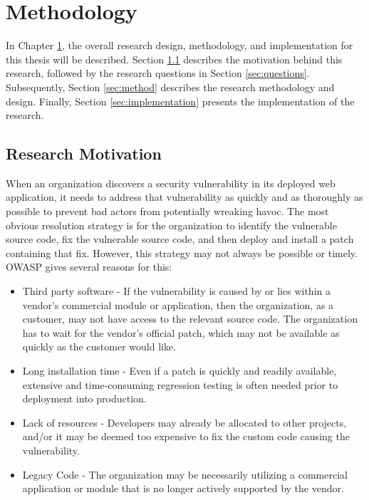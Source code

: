 \chapter{Methodology} \label{chap:method}
In Chapter \ref{chap:method}, the overall research design, methodology, and implementation for this thesis will be described. Section \ref{sec:motivation} describes the motivation behind this research, followed by the research questions in Section \ref{sec:questions}. Subsequently, Section \ref{sec:method} describes the research methodology and design. Finally, Section \ref{sec:implementation} presents the implementation of the research.

\section{Research Motivation} \label{sec:motivation}
When an organization discovers a security vulnerability in its deployed web application, it needs to address that vulnerability as quickly and as thoroughly as possible to prevent bad actors from potentially wreaking havoc. The most obvious resolution strategy is for the organization to identify the vulnerable source code, fix the vulnerable source code, and then deploy and install a patch containing that fix. However, this strategy may not always be possible or timely. OWASP \cite{virtualpatchingbest} \cite{virtualpatchingcheat} gives several reasons for this:

\begin{itemize}
\item Third party software - If the vulnerability is caused by or lies within a vendor's commercial module or application, then the organization, as a customer, may not have access to the relevant source code. The organization has to wait for the vendor's official patch, which may not be available as quickly as the customer would like.

\item Long installation time - Even if a patch is quickly and readily available, extensive and time-consuming regression testing is often needed prior to deployment into production.

\item Lack of resources - Developers may already be allocated to other projects, and/or it may be deemed too expensive to fix the custom code causing the vulnerability.

\item Legacy Code - The organization may be necessarily utilizing a commercial application or module that is no longer actively supported by the vendor.
\end{itemize}

